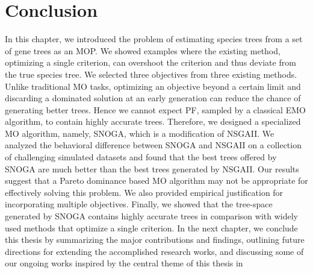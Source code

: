  \section{Conclusion} In this chapter, we introduced the problem of estimating species trees from a set of gene trees as an MOP. We showed examples where the existing method, optimizing a single criterion, can overshoot the criterion and thus deviate from the true species tree. We selected three objectives from three existing methods. Unlike traditional MO tasks, optimizing an objective beyond a certain limit and discarding a dominated solution at an early generation can reduce the chance of generating better trees. Hence we cannot expect PF, sampled by a classical EMO algorithm, to contain highly accurate trees. Therefore, we designed a specialized MO algorithm, namely, SNOGA, which is a modification of NSGAII. We analyzed the behavioral difference between SNOGA and NSGAII on a collection of challenging simulated datasets and found that the best trees offered by SNOGA are much better than the best trees generated by NSGAII. Our results suggest that a Pareto dominance based MO algorithm may not be appropriate for effectively solving this problem. We also provided empirical justification for incorporating multiple objectives. Finally, we showed that the tree-space generated by SNOGA contains highly accurate trees in comparison with widely used methods that optimize a single criterion. In the next chapter, we conclude this thesis by summarizing the major contributions and findings, outlining future directions for extending the accomplished research works, and discussing some of our ongoing works inspired by the central theme of this thesis in





